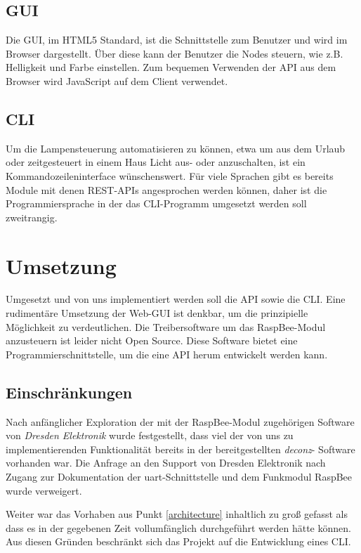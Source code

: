 \documentclass[a4paper,12pt]{article}
\begin{document}
\subsection{GUI}

Die GUI, im HTML5 Standard, ist die Schnittstelle zum Benutzer und wird im Browser dargestellt.
Über diese kann der Benutzer die Nodes steuern, wie z.B. Helligkeit und Farbe einstellen.
Zum bequemen Verwenden der API aus dem Browser wird JavaScript auf dem Client verwendet.

\subsection{CLI}

Um die Lampensteuerung automatisieren zu können, etwa um aus dem Urlaub oder
zeitgesteuert in einem Haus Licht aus- oder anzuschalten, ist ein
Kommandozeileninterface wünschenswert. Für viele Sprachen gibt es bereits
Module mit denen REST-APIs angesprochen werden können, daher ist die
Programmiersprache in der das CLI-Programm umgesetzt werden soll zweitrangig.

\newpage

\section{Umsetzung}
\label{doing}

Umgesetzt und von uns implementiert werden soll die API sowie die CLI. Eine
rudimentäre Umsetzung der Web-GUI ist denkbar, um die prinzipielle Möglichkeit zu
verdeutlichen.
Die Treibersoftware um das RaspBee-Modul anzusteuern ist leider nicht
Open Source. Diese Software bietet eine Programmierschnittstelle, um die eine API
herum entwickelt werden kann.

\subsection{Einschränkungen}

Nach anfänglicher Exploration der mit der RaspBee-Modul zugehörigen Software
von \emph{Dresden Elektronik} wurde festgestellt, dass viel der von uns zu
implementierenden Funktionalität bereits in der bereitgestellten \emph{\acrshort{deconz}}-
Software vorhanden war. Die Anfrage an den Support von Dresden Elektronik
nach Zugang zur Dokumentation der \acrshort{uart}-Schnittstelle und dem Funkmodul
RaspBee wurde verweigert.

Weiter war das Vorhaben aus Punkt \ref{architecture} inhaltlich zu groß gefasst
als dass es in der gegebenen Zeit vollumfänglich durchgeführt werden hätte können.
Aus diesen Gründen beschränkt sich das Projekt auf die Entwicklung eines CLI.
\end{document}
